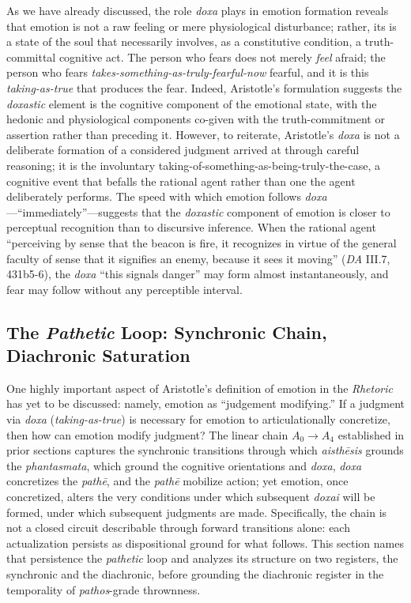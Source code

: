 \documentclass{article}
\begin{document}
As we have already discussed, the role \textit{doxa} plays in emotion formation reveals that emotion is not a raw feeling or mere physiological disturbance; rather, its is a state of the soul that necessarily involves, as a constitutive condition, a truth-committal cognitive act. The person who fears does not merely \textit{feel} afraid; the person who fears \textit{takes-something-as-truly-fearful-now} fearful, and it is this \textit{taking-as-true} that produces the fear. Indeed, Aristotle's formulation suggests the \textit{doxastic} element is the cognitive component of the emotional state, with the hedonic and physiological components co-given with the truth-commitment or assertion rather than preceding it. However, to reiterate, Aristotle's \textit{doxa} is not a deliberate formation of a considered judgment arrived at through careful reasoning; it is the involuntary taking-of-something-as-being-truly-the-case, a cognitive event that befalls the rational agent rather than one the agent deliberately performs. The speed with which emotion follows \textit{doxa}---``immediately''---suggests that the \textit{doxastic} component of emotion is closer to perceptual recognition than to discursive inference. When the rational agent ``perceiving by sense that the beacon is fire, it recognizes in virtue of the general faculty of sense that it signifies an enemy, because it sees it moving'' (\textit{DA} III.7, 431b5-6), the \textit{doxa} ``this signals danger'' may form almost instantaneously, and fear may follow without any perceptible interval. 

\subsection{The \textit{Pathetic} Loop: Synchronic Chain, Diachronic Saturation}

One highly important aspect of Aristotle's definition of emotion in the \textit{Rhetoric} has yet to be discussed: namely, emotion as ``judgement modifying.'' If a judgment via \textit{doxa} (\textit{taking-as-true}) is necessary for emotion to articulationally concretize, then how can emotion modify judgment? The linear chain $A_0 \rightarrow A_4$ established in prior sections captures the synchronic transitions through which \textit{aisthēsis} grounds the \textit{phantasmata}, which ground the cognitive orientations and \textit{doxa}, \textit{doxa} concretizes the \textit{pathē}, and the \textit{pathē} mobilize action; yet emotion, once concretized, alters the very conditions under which subsequent \textit{doxai} will be formed, under which subsequent judgments are made. Specifically, the chain is not a closed circuit describable through forward transitions alone: each actualization persists as dispositional ground for what follows. This section names that persistence the \textit{pathetic} loop and analyzes its structure on two registers, the synchronic and the diachronic, before grounding the diachronic register in the temporality of \textit{pathos}-grade thrownness.
\end{document}
